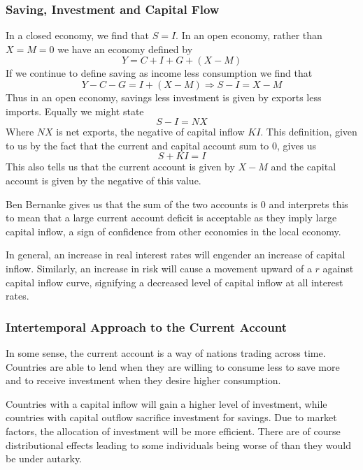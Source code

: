 \documentclass[12pt]{report}
\begin{document}
\begin{flushleft}
\subsubsection*{Saving, Investment and Capital Flow}

In a closed economy, we find that \(S = I\). In an open economy, rather than
\(X = M = 0\) we have an economy defined by
\[Y = C + I + G + (X - M)\]
If we continue to define saving as income less consumption we find that
\[Y - C - G = I + (X - M) \Rightarrow S - I = X - M\]
Thus in an open economy, savings less investment is given by exports less
imports. Equally we might state
\[S - I = NX\]
Where \(NX\) is net exports, the negative of capital inflow \(KI\). This
definition, given to us by the fact that the current and capital account sum
to \(0\), gives us
\[S + KI = I\]
This also tells us that the current account is given by \(X - M\) and the
capital account is given by the negative of this value. \par
Ben Bernanke gives us that the sum of the two accounts is \(0\) and interprets
this to mean that a large current account deficit is acceptable as they imply
large capital inflow, a sign of confidence from other economies in the local
economy. \par
In general, an increase in real interest rates will engender an increase of
capital inflow. Similarly, an increase in risk will cause a movement upward of
a \(r\) against capital inflow curve, signifying a decreased level of capital
inflow at all interest rates.

\subsubsection*{Intertemporal Approach to the Current Account}

In some sense, the current account is a way of nations trading across time.
Countries are able to lend when they are willing to consume less to save more
and to receive investment when they desire higher consumption. \par
Countries with a capital inflow will gain a higher level of investment, while
countries with capital outflow sacrifice investment for savings. Due to market
factors, the allocation of investment will be more efficient. There are of
course distributional effects leading to some individuals being worse of than
they would be under autarky.


\end{flushleft}
\end{document}
